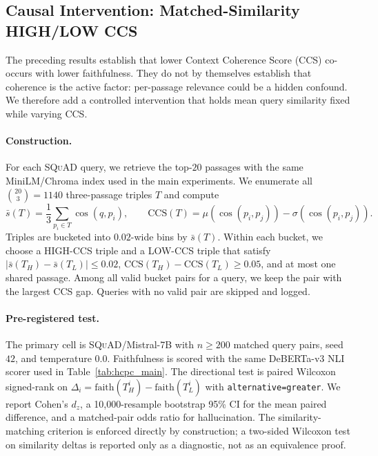 
\subsection{Causal Intervention: Matched-Similarity HIGH/LOW CCS}
\label{sec:causal_intervention}


The preceding results establish that lower Context Coherence Score
(CCS) co-occurs with lower faithfulness. They do not by themselves
establish that coherence is the active factor: per-passage relevance
could be a hidden confound. We therefore add a controlled intervention
that holds mean query similarity fixed while varying CCS.

\paragraph{Construction.}
For each \textsc{SQuAD} query, we retrieve the top-$20$ passages with
the same MiniLM/Chroma index used in the main experiments. We enumerate
all $\binom{20}{3}=1140$ three-passage triples $T$ and compute
\[
  \bar{s}(T)=\frac{1}{3}\sum_{p_i\in T}\cos(q,p_i),
  \qquad
  \mathrm{CCS}(T)=\mu\!\left(\cos(p_i,p_j)\right)
  -\sigma\!\left(\cos(p_i,p_j)\right).
\]
Triples are bucketed into $0.02$-wide bins by $\bar{s}(T)$. Within each
bucket, we choose a HIGH-CCS triple and a LOW-CCS triple that satisfy
$|\bar{s}(T_H)-\bar{s}(T_L)|\le 0.02$,
$\mathrm{CCS}(T_H)-\mathrm{CCS}(T_L)\ge 0.05$, and at most one shared
passage. Among all valid bucket pairs for a query, we keep the pair with
the largest CCS gap. Queries with no valid pair are skipped and logged.

\paragraph{Pre-registered test.}
The primary cell is \textsc{SQuAD}/Mistral-7B with $n\ge 200$ matched
query pairs, seed $42$, and temperature $0.0$. Faithfulness is scored
with the same DeBERTa-v3 NLI scorer used in Table~\ref{tab:hcpc_main}.
The directional test is paired Wilcoxon signed-rank on
$\Delta_i=\mathrm{faith}(T_H^i)-\mathrm{faith}(T_L^i)$ with
\texttt{alternative=greater}. We report Cohen's $d_z$, a
10{,}000-resample bootstrap 95\% CI for the mean paired difference, and
a matched-pair odds ratio for hallucination. The similarity-matching
criterion is enforced directly by construction; a two-sided Wilcoxon
test on similarity deltas is reported only as a diagnostic, not as an
equivalence proof.

